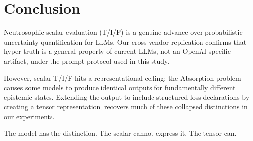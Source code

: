 \section{Conclusion}

Neutrosophic scalar evaluation (T/I/F) is a genuine advance over
probabilistic uncertainty quantification for LLMs. Our cross-vendor
replication confirms that hyper-truth is a general property of current
LLMs, not an OpenAI-specific artifact, under the prompt protocol used in
this study.

However, scalar T/I/F hits a representational ceiling: the Absorption
problem causes some models to produce identical outputs for
fundamentally different epistemic states. Extending the output to
include structured loss declarations by creating a tensor
representation, recovers much of these collapsed distinctions in our
experiments.

The model has the distinction. The scalar cannot express it. The tensor
can.
